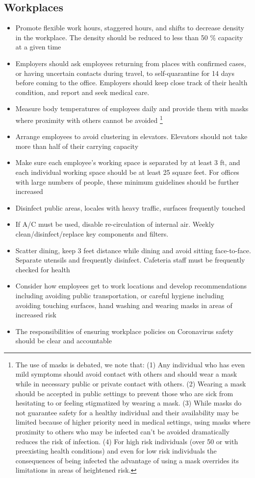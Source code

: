 \documentclass[onecolumn,journal]{IEEEtran}
\begin{document}
\begin{multicols}{2}
\section*{Workplaces}
\begin{itemize}
    \item Promote flexible work hours, staggered hours, and shifts to decrease density in the workplace. The density should be reduced to less than 50 \% capacity at a given time
    \item Employers should ask employees returning from places with confirmed cases, or having uncertain contacts during travel, to self-quarantine for 14 days before coming to the office. Employers should keep close track of their health condition, and report and seek medical care.
    \item Measure body temperatures of employees daily and provide them with masks where proximity with others cannot be avoided \footnote{The use of masks is debated, we note that: (1) Any individual who has even mild symptoms should avoid contact with others and should wear a mask while in necessary public or private contact with others. (2) Wearing a mask should be accepted in public settings to prevent those who are sick from hesitating to or feeling stigmatized by wearing a mask. (3) While masks do not guarantee safety for a healthy individual and their availability may be limited because of higher priority need in medical settings, using masks where proximity to others who may be infected can't be avoided dramatically reduces the risk of infection. (4) For high risk individuals (over 50 or with preexisting health conditions) and even for low risk individuals the consequences of being infected the advantage of using a mask overrides its limitations in areas of heightened risk. }
    \item Arrange employees to avoid clustering in elevators. Elevators should not take more than half of their carrying capacity
    \item Make sure each employee's working space is separated by at least 3 ft, and each individual working space should be at least 25 square feet. For offices with large numbers of people, these minimum guidelines should be further increased
    \item Disinfect public areas, locales with heavy traffic, surfaces frequently touched
    \item If A/C must be used, disable re-circulation of internal air. Weekly clean/disinfect/replace key components and filters.
    \item Scatter dining, keep 3 feet distance while dining and avoid sitting face-to-face. Separate utensils and frequently disinfect. Cafeteria staff must be frequently checked for health
    \item Consider how employees get to work locations and develop recommendations including avoiding public transportation, or careful hygiene including avoiding touching surfaces, hand washing and wearing masks in areas of increased risk
    \item The responsibilities of ensuring workplace policies on Coronavirus safety should be clear and accountable
\end{itemize}


\end{multicols}
\end{document}
